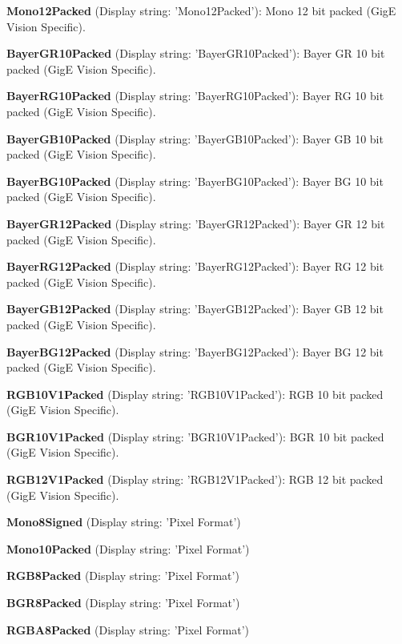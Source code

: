 \begin{DoxyItemize}
\item {\bfseries Mono12\+Packed} (Display string\+: 'Mono12\+Packed')\+: Mono 12 bit packed (Gig\+E Vision Specific).
\item {\bfseries Bayer\+G\+R10\+Packed} (Display string\+: 'Bayer\+G\+R10\+Packed')\+: Bayer G\+R 10 bit packed (Gig\+E Vision Specific).
\item {\bfseries Bayer\+R\+G10\+Packed} (Display string\+: 'Bayer\+R\+G10\+Packed')\+: Bayer R\+G 10 bit packed (Gig\+E Vision Specific).
\item {\bfseries Bayer\+G\+B10\+Packed} (Display string\+: 'Bayer\+G\+B10\+Packed')\+: Bayer G\+B 10 bit packed (Gig\+E Vision Specific).
\item {\bfseries Bayer\+B\+G10\+Packed} (Display string\+: 'Bayer\+B\+G10\+Packed')\+: Bayer B\+G 10 bit packed (Gig\+E Vision Specific).
\item {\bfseries Bayer\+G\+R12\+Packed} (Display string\+: 'Bayer\+G\+R12\+Packed')\+: Bayer G\+R 12 bit packed (Gig\+E Vision Specific).
\item {\bfseries Bayer\+R\+G12\+Packed} (Display string\+: 'Bayer\+R\+G12\+Packed')\+: Bayer R\+G 12 bit packed (Gig\+E Vision Specific).
\item {\bfseries Bayer\+G\+B12\+Packed} (Display string\+: 'Bayer\+G\+B12\+Packed')\+: Bayer G\+B 12 bit packed (Gig\+E Vision Specific).
\item {\bfseries Bayer\+B\+G12\+Packed} (Display string\+: 'Bayer\+B\+G12\+Packed')\+: Bayer B\+G 12 bit packed (Gig\+E Vision Specific).
\item {\bfseries R\+G\+B10\+V1\+Packed} (Display string\+: 'R\+G\+B10\+V1\+Packed')\+: R\+G\+B 10 bit packed (Gig\+E Vision Specific).
\item {\bfseries B\+G\+R10\+V1\+Packed} (Display string\+: 'B\+G\+R10\+V1\+Packed')\+: B\+G\+R 10 bit packed (Gig\+E Vision Specific).
\item {\bfseries R\+G\+B12\+V1\+Packed} (Display string\+: 'R\+G\+B12\+V1\+Packed')\+: R\+G\+B 12 bit packed (Gig\+E Vision Specific).
\item {\bfseries Mono8\+Signed} (Display string\+: 'Pixel Format')
\item {\bfseries Mono10\+Packed} (Display string\+: 'Pixel Format')
\item {\bfseries R\+G\+B8\+Packed} (Display string\+: 'Pixel Format')
\item {\bfseries B\+G\+R8\+Packed} (Display string\+: 'Pixel Format')
\item {\bfseries R\+G\+B\+A8\+Packed} (Display string\+: 'Pixel Format')

\end{DoxyItemize}
